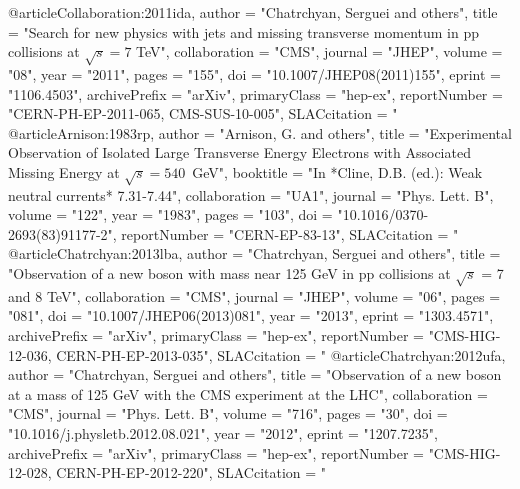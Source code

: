@article{Collaboration:2011ida,
      author         = "Chatrchyan, Serguei and others",
      title          = "{Search for new physics with jets and missing transverse
                        momentum in pp collisions at $\sqrt{s}=7$ TeV}",
      collaboration  = "CMS",
      journal        = "JHEP",
      volume         = "08",
      year           = "2011",
      pages          = "155",
      doi            = "10.1007/JHEP08(2011)155",
      eprint         = "1106.4503",
      archivePrefix  = "arXiv",
      primaryClass   = "hep-ex",
      reportNumber   = "CERN-PH-EP-2011-065, CMS-SUS-10-005",
      SLACcitation   = "%
}
@article{Arnison:1983rp,
      author         = "Arnison, G. and others",
      title          = "{Experimental Observation of Isolated Large Transverse
                        Energy Electrons with Associated Missing Energy at
                        $\sqrt{s}= 540$~GeV}",
      booktitle      = "{In *Cline, D.B. (ed.): Weak neutral currents*
                        7.31-7.44}",
      collaboration  = "UA1",
      journal        = "Phys. Lett. B",
      volume         = "122",
      year           = "1983",
      pages          = "103",
      doi            = "10.1016/0370-2693(83)91177-2",
      reportNumber   = "CERN-EP-83-13",
      SLACcitation   = "%
}
@article{Chatrchyan:2013lba,
      author         = "Chatrchyan, Serguei and others",
      title          = "{Observation of a new boson with mass near 125 GeV in pp
                        collisions at $\sqrt{s}$ = 7 and 8 TeV}",
      collaboration  = "CMS",
      journal        = "JHEP",
      volume         = "06",
      pages          = "081",
      doi            = "10.1007/JHEP06(2013)081",
      year           = "2013",
      eprint         = "1303.4571",
      archivePrefix  = "arXiv",
      primaryClass   = "hep-ex",
      reportNumber   = "CMS-HIG-12-036, CERN-PH-EP-2013-035",
      SLACcitation   = "%
}
@article{Chatrchyan:2012ufa,
      author         = "Chatrchyan, Serguei and others",
      title          = "{Observation of a new boson at a mass of 125 GeV with the
                        {CMS} experiment at the {LHC}}",
      collaboration  = "CMS",
      journal        = "Phys. Lett. B",
      volume         = "716",
      pages          = "30",
      doi            = "10.1016/j.physletb.2012.08.021",
      year           = "2012",
      eprint         = "1207.7235",
      archivePrefix  = "arXiv",
      primaryClass   = "hep-ex",
      reportNumber   = "CMS-HIG-12-028, CERN-PH-EP-2012-220",
      SLACcitation   = "%
}
